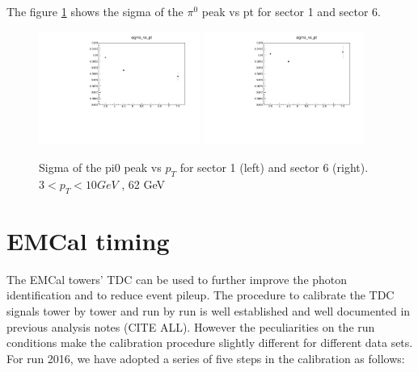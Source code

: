 \documentclass{article}
\begin{document}
The figure \ref{sigma62GeV} shows the sigma of the $\pi^{0}$ peak vs pt for sector 1 and sector 6. 
\begin{figure}
\includegraphics[width=0.47\textwidth]{fig_pi0vn/sect1_sigmavspt62GeV.pdf}
\includegraphics[width=0.47\textwidth]{fig_pi0vn/sect6_sigmavspt62GeV.pdf}
\caption{Sigma of the pi0 peak vs $p_{T}$ for sector 1 (left) and sector 6 (right). $3<p_{T}<10GeV$ , 62 GeV }
\label{sigma62GeV}
\end{figure}
\section{EMCal timing}
\label{section:EMCal timing}
The EMCal towers' TDC can be used to further improve the photon identification and to reduce event pileup.
The procedure to calibrate the TDC signals tower by tower and run by run is well established and well documented in previous analysis notes (CITE ALL).
However the peculiarities on the run conditions make the calibration procedure slightly different for different data sets.
For run 2016, we have adopted a series of five steps in the calibration as follows:
\end{document}
